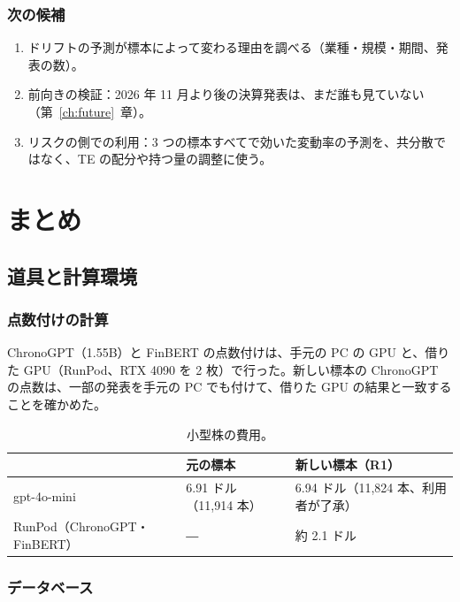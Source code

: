 \documentclass[xelatex,ja=standard,jafont=haranoaji,a4paper,10pt]{bxjsreport}
\newcommand{\chapref}[1]{第~\ref{#1}~章}
\begin{document}
\section{次の候補}

\begin{enumerate}
\item ドリフトの予測が標本によって変わる理由を調べる（業種・規模・期間、発表の数）。
\item 前向きの検証：2026 年 11 月より後の決算発表は、まだ誰も見ていない（\chapref{ch:future}）。
\item リスクの側での利用：3 つの標本すべてで効いた変動率の予測を、共分散ではなく、TE の配分や持つ量の調整に使う。
\end{enumerate}

\part{まとめ}

\chapter{道具と計算環境}\label{ch:tools}

\section{点数付けの計算}

ChronoGPT（1.55B）と FinBERT の点数付けは、手元の PC の GPU と、借りた GPU（RunPod、RTX 4090 を 2 枚）で行った。新しい標本の ChronoGPT の点数は、一部の発表を手元の PC でも付けて、借りた GPU の結果と一致することを確かめた。

\begin{table}[H]
\centering\small
\caption{小型株の費用。}
\label{tab:cost}
\begin{tabular}{lll}
\toprule
 & 元の標本 & 新しい標本（R1） \\
\midrule
gpt-4o-mini & 6.91 ドル（11,914 本） & 6.94 ドル（11,824 本、利用者が了承） \\
RunPod（ChronoGPT・FinBERT） & ― & 約 2.1 ドル \\
\bottomrule
\end{tabular}
\end{table}

\section{データベース}
\end{document}
